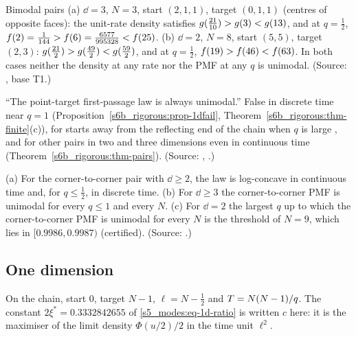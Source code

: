 \begin{catheorem}{Bimodal pairs}\label{s6b_rigorous:thm-pairs}
(a) $\dd=3$, $N=3$, start $(2,1,1)$, target $(0,1,1)$ (centres of opposite faces): the unit-rate density satisfies
$g(\tfrac{21}{10})>g(3)<g(13)$, and at $q=\frac12$, $f(2)=\frac1{144}>f(6)=\frac{6577}{995328}<f(25)$.
(b) $\dd=2$, $N=8$, start $(5,5)$, target $(2,3)$: $g(\tfrac{21}2)>g(\tfrac{49}2)<g(\tfrac{59}2)$, and at
$q=\frac12$, $f(19)>f(46)<f(63)$. In both cases neither the density at any rate nor the PMF at any $q$ is
unimodal.
\textup{(Source: , base T1.)}
\end{catheorem}

\begin{refuted}\label{s6b_rigorous:ref-unimodal}
``The point-target first-passage law is always unimodal.'' False in discrete time near $q=1$
(Proposition~\ref{s6b_rigorous:prop-1dfail}, Theorem~\ref{s6b_rigorous:thm-finite}(c)), for starts away from the
reflecting end of the chain when $q$ is large , and for other pairs in two and three dimensions
even in continuous time (Theorem~\ref{s6b_rigorous:thm-pairs}).
\textup{(Source: , .)}
\end{refuted}

\begin{conjecture}\label{s6b_rigorous:conj-unimodal}
(a) For the corner-to-corner pair with $\dd\ge2$, the law is log-concave in continuous time and, for $q\le\frac12$, in
discrete time. (b) For $\dd\ge3$ the corner-to-corner PMF is unimodal for every $q\le1$ and every $N$. (c) For
$\dd=2$ the largest $q$ up to which the corner-to-corner PMF is unimodal for every $N$ is the threshold of $N=9$,
which lies in $[0.9986,0.9987)$ (certified).
\textup{(Source: .)}
\end{conjecture}

\subsection{One dimension}\label{s6b_rigorous:ssec-1d}

On the chain, start $0$, target $N-1$, $\ell=N-\frac12$ and $T=N(N-1)/q$. The constant $2\xi^{*}=0.3332842655$ of
\eqref{s5_modes:eq-1d-ratio} is written $c$ here: it is the maximiser of the limit density $\Phi(u/2)/2$ in the time unit
$\ell^{2}$.

